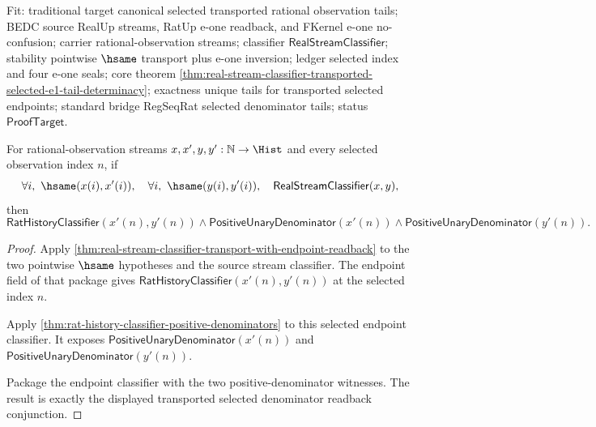Fit: traditional target canonical selected transported rational observation
tails; BEDC source RealUp streams, RatUp e-one readback, and FKernel e-one
no-confusion; carrier rational-observation streams; classifier
$\mathsf{RealStreamClassifier}$; stability pointwise $\hsame$ transport plus
e-one inversion; ledger selected index and four e-one seals; core theorem
\autoref{thm:real-stream-classifier-transported-selected-e1-tail-determinacy};
exactness unique tails for transported selected endpoints; standard bridge
RegSeqRat selected denominator tails; status $\mathsf{ProofTarget}$.

\begin{theorem}
\label{thm:real-stream-classifier-transported-selected-positive-denominator-package}
For rational-observation streams $x,x',y,y':\mathbb{N}\to\Hist$ and every
selected observation index $n$, if
$$
\forall i,\ \hsame(x(i),x'(i)),\quad
\forall i,\ \hsame(y(i),y'(i)),\quad
\mathsf{RealStreamClassifier}(x,y),
$$
then
$$
\mathsf{RatHistoryClassifier}(x'(n),y'(n))\land
\mathsf{PositiveUnaryDenominator}(x'(n))\land
\mathsf{PositiveUnaryDenominator}(y'(n)).
$$
\end{theorem}
\begin{proof}
Apply \autoref{thm:real-stream-classifier-transport-with-endpoint-readback}
to the two pointwise $\hsame$ hypotheses and the source stream classifier. The
endpoint field of that package gives
$\mathsf{RatHistoryClassifier}(x'(n),y'(n))$ at the selected index $n$.

Apply \autoref{thm:rat-history-classifier-positive-denominators} to this
selected endpoint classifier. It exposes
$\mathsf{PositiveUnaryDenominator}(x'(n))$ and
$\mathsf{PositiveUnaryDenominator}(y'(n))$.

Package the endpoint classifier with the two positive-denominator witnesses.
The result is exactly the displayed transported selected denominator readback
conjunction.
\end{proof}

